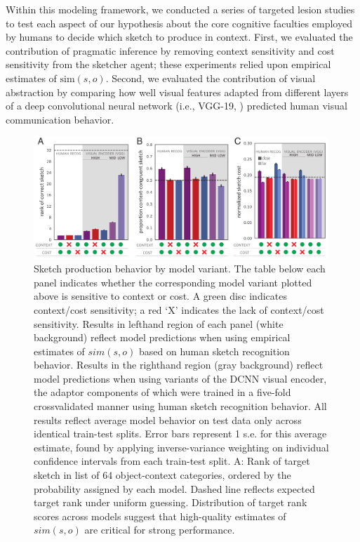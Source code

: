 \documentclass[9pt,twocolumn,twoside]{pnas-new}
\begin{document}
Within this modeling framework, we conducted a series of targeted lesion studies to test each aspect of our hypothesis about the core cognitive faculties employed by humans to decide which sketch to produce in context. 
First, we evaluated the contribution of pragmatic inference by removing context sensitivity and cost sensitivity from the sketcher agent; these experiments relied upon empirical estimates of $\textrm{sim}(s,o)$. 
Second, we evaluated the contribution of visual abstraction by comparing how well visual features adapted from different layers of a deep convolutional neural network (i.e., VGG-19, \cite{simonyan2014very}) predicted human visual communication behavior. 

\begin{figure}[htbp]
\centering
\includegraphics[width=0.99\textwidth]{figures/5_model_results_2.pdf}
\caption{Sketch production behavior by model variant. The table below each panel indicates whether the corresponding model variant plotted above is sensitive to context or cost. A green disc indicates context/cost sensitivity; a red `X' indicates the lack of context/cost sensitivity. 
Results in lefthand region of each panel (white background) reflect model predictions when using empirical estimates of $sim(s,o)$ based on human sketch recognition behavior. 
Results in the righthand region (gray background) reflect model predictions when using variants of the DCNN visual encoder, the adaptor components of which were trained in a five-fold crossvalidated manner using human sketch recognition behavior. 
All results reflect average model behavior on test data only across identical train-test splits. 
Error bars represent 1 s.e. for this average estimate, found by applying inverse-variance weighting on individual confidence intervals from each train-test split. 
A: Rank of target sketch in list of 64 object-context categories, ordered by the probability assigned by each model. 
Dashed line reflects expected target rank under uniform guessing. 
Distribution of target rank scores across models suggest that high-quality estimates of $sim(s,o)$ are critical for strong performance. 
}
\end{figure}
\end{document}
